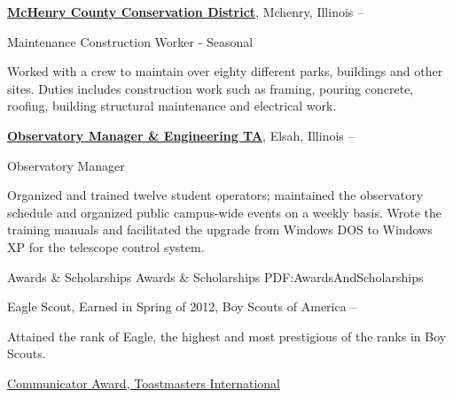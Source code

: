 \documentclass[a4paper,MMMyyyy,nonstopmode]{simpleresumecv}
\begin{document}
\begin{Body}
\begin{Detail}

\href{http://www.mccdistrict.org/rccms/}
{\textbf{
McHenry County Conservation District}},
Mchenry, Illinois
\hfill {} --

\Gap
\BulletItem
Maintenance Construction Worker - Seasonal 
\begin{Detail}
\SubBulletItem
Worked with a crew to maintain over eighty different parks, buildings and other sites. Duties includes construction work such as framing, pouring concrete, roofing, building structural maintenance and electrical work.
\Gap
\end{Detail}


\href{http://www.mccdistrict.org/rccms/}
{\textbf{Observatory Manager \& Engineering TA}},
Elsah, Illinois
\hfill
{} --

\Gap
\BulletItem
Observatory Manager

\begin{Detail}
\SubBulletItem
Organized and trained twelve student operators; maintained the observatory schedule and organized public campus-wide events on a weekly basis.
\SubBulletItem
Wrote the training manuals and facilitated the upgrade from Windows DOS to Windows XP for the telescope control system.
\end{Detail}


\Section
{Awards \&\newline
Scholarships}
{Awards \& Scholarships}
{PDF:AwardsAndScholarships}

\BulletItem
Eagle Scout,
Earned in Spring of 2012,
Boy Scouts of America
\hfill
{} --
\begin{Detail}
\Item
Attained the rank of Eagle, the highest and most prestigious of the ranks in Boy Scouts.
\end{Detail}

\Gap
\BulletItem
\href{https://www.toastmasters.org/Education/Communication-Track}{Communicator Award,
Toastmasters International}
\hfill
{}




\end{Detail}
\end{Body}
\end{document}
